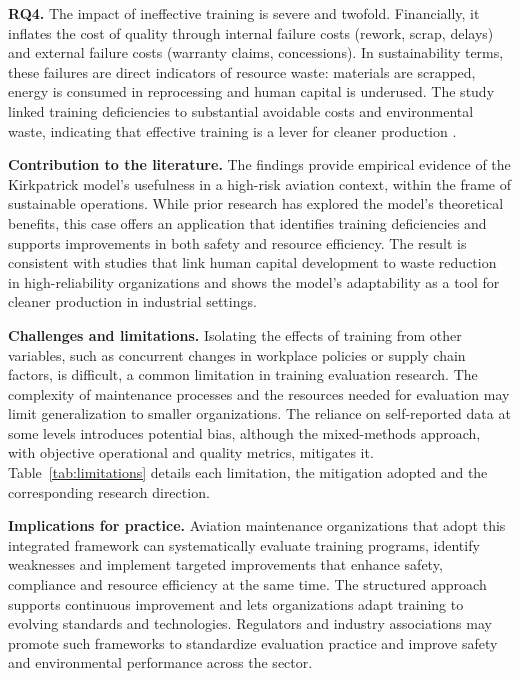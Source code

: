 \textbf{RQ4.} The impact of ineffective training is severe and twofold. Financially, it inflates the cost of quality through internal failure costs (rework, scrap, delays) and external failure costs (warranty claims, concessions). In sustainability terms, these failures are direct indicators of resource waste: materials are scrapped, energy is consumed in reprocessing and human capital is underused. The study linked training deficiencies to substantial avoidable costs and environmental waste, indicating that effective training is a lever for cleaner production \parencite{Chen2023}.

\textbf{Contribution to the literature.} The findings provide empirical evidence of the Kirkpatrick model's usefulness in a high-risk aviation context, within the frame of sustainable operations. While prior research has explored the model's theoretical benefits, this case offers an application that identifies training deficiencies and supports improvements in both safety and resource efficiency. The result is consistent with studies that link human capital development to waste reduction in high-reliability organizations \parencite{Sousa2025} and shows the model's adaptability as a tool for cleaner production in industrial settings.

\textbf{Challenges and limitations.} Isolating the effects of training from other variables, such as concurrent changes in workplace policies or supply chain factors, is difficult, a common limitation in training evaluation research. The complexity of maintenance processes and the resources needed for evaluation may limit generalization to smaller organizations. The reliance on self-reported data at some levels introduces potential bias, although the mixed-methods approach, with objective operational and quality metrics, mitigates it. Table~\ref{tab:limitations} details each limitation, the mitigation adopted and the corresponding research direction.



\textbf{Implications for practice.} Aviation maintenance organizations that adopt this integrated framework can systematically evaluate training programs, identify weaknesses and implement targeted improvements that enhance safety, compliance and resource efficiency at the same time. The structured approach supports continuous improvement and lets organizations adapt training to evolving standards and technologies. Regulators and industry associations may promote such frameworks to standardize evaluation practice and improve safety and environmental performance across the sector.

